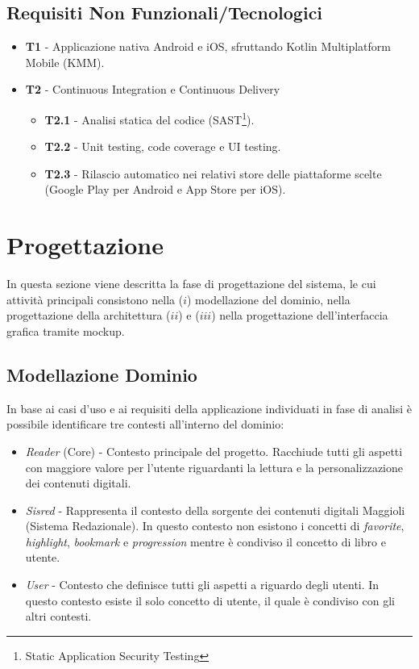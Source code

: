 \subsection{Requisiti Non Funzionali/Tecnologici}
\begin{itemize}
    \item \textbf{T1} - Applicazione nativa Android e iOS, sfruttando Kotlin Multiplatform Mobile (KMM).
    \item \textbf{T2} - Continuous Integration e Continuous Delivery
    \begin{itemize}
        \item \textbf{T2.1} - Analisi statica del codice (SAST\footnote{Static Application Security Testing}).
        \item \textbf{T2.2} - Unit testing, code coverage e UI testing.
        \item \textbf{T2.3} - Rilascio automatico nei relativi store delle piattaforme scelte (Google Play per Android e App Store per iOS).
    \end{itemize}
\end{itemize}

\section{Progettazione}
In questa sezione viene descritta la fase di progettazione del sistema, le cui attività principali consistono nella ($i$) modellazione del dominio, nella progettazione della architettura ($ii$) e ($iii$) nella progettazione dell'interfaccia grafica tramite mockup.

\subsection{Modellazione Dominio}
In base ai casi d'uso e ai requisiti della applicazione individuati in fase di analisi è possibile identificare tre contesti all'interno del dominio:

\begin{itemize}
    \item \textit{Reader} (Core) - Contesto principale del progetto. Racchiude tutti gli aspetti con maggiore valore per l'utente riguardanti la lettura e la personalizzazione dei contenuti digitali. 
    \item \textit{Sisred} - Rappresenta il contesto della sorgente dei contenuti digitali Maggioli (Sistema Redazionale\cite{amslaurea23043}). In questo contesto non esistono i concetti di \textit{favorite}, \textit{highlight}, \textit{bookmark} e \textit{progression} mentre è condiviso il concetto di libro e utente.
    \item \textit{User} - Contesto che definisce tutti gli aspetti a riguardo degli utenti. In questo contesto esiste il solo concetto di utente, il quale è condiviso con gli altri contesti.
\end{itemize}

